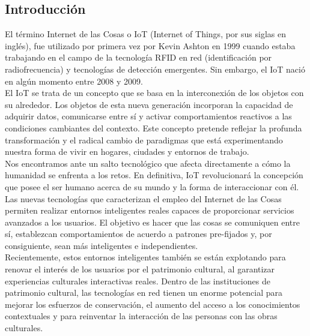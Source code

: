 \begin{center}
    \section*{\LARGE Introducción}
\end{center}

    \setcounter{page}{1} %
    \pagestyle{plain} %

    El término Internet de las Cosas o IoT (Internet of Things, por sus siglas en inglés), fue utilizado por primera vez por Kevin Ashton en 1999 cuando estaba trabajando en el campo de la tecnología RFID en red (identificación por radiofrecuencia) y tecnologías de detección emergentes. Sin embargo, el IoT nació en algún momento entre 2008 y 2009. \cite{evolucionIoT}\\

    El IoT se trata de un concepto que se basa en la interconexión de los objetos con su alrededor. Los objetos de esta nueva generación incorporan la capacidad de adquirir datos, comunicarse entre sí y activar comportamientos reactivos a las condiciones cambiantes del contexto. Este concepto pretende reflejar la profunda transformación y el radical cambio de paradigmas que está experimentando nuestra forma de vivir en hogares, ciudades y entornos de trabajo.\\

    Nos encontramos ante un salto tecnológico que afecta directamente a cómo la humanidad se enfrenta a los retos. En definitiva, IoT revolucionará la concepción que posee el ser humano acerca de su mundo y la forma de interaccionar con él. \cite{revolucionDefinitiva} \\

    Las nuevas tecnologías que caracterizan el empleo del Internet de las Cosas permiten realizar entornos inteligentes reales capaces de proporcionar servicios avanzados a los usuarios. El objetivo es hacer que las cosas se comuniquen entre sí, establezcan comportamientos de acuerdo a patrones pre-fijados y, por consiguiente, sean más inteligentes e independientes.\\
    
    Recientemente, estos entornos inteligentes también se están explotando para renovar el interés de los usuarios por el patrimonio cultural, al garantizar experiencias culturales interactivas reales. Dentro de las instituciones de patrimonio cultural, las tecnologías en red tienen un enorme potencial para mejorar los esfuerzos de conservación, el aumento del acceso a los conocimientos contextuales y para reinventar la interacción de las personas con las obras culturales.\\
    

